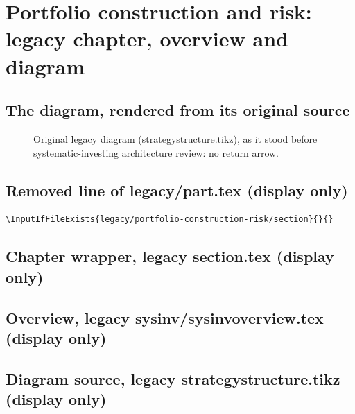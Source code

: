 \documentclass[a4paper,oneside,openany]{book}
\begin{document}
\lstset{basicstyle=\ttfamily\footnotesize,breaklines=true,columns=fullflexible,keepspaces=true,frame=single}
\chapter*{Portfolio construction and risk: legacy chapter, overview and diagram}

\section*{The diagram, rendered from its original source}
\begin{figure}[H]
\centering

\par\medskip\small Original legacy diagram (strategystructure.tikz), as it stood before systematic-investing architecture review: no return arrow.
\end{figure}

\section*{Removed line of legacy/part.tex (display only)}
\begin{lstlisting}
\InputIfFileExists{legacy/portfolio-construction-risk/section}{}{}
\end{lstlisting}

\section*{Chapter wrapper, legacy section.tex (display only)}


\section*{Overview, legacy sysinv/sysinvoverview.tex (display only)}


\section*{Diagram source, legacy strategystructure.tikz (display only)}

\end{document}
